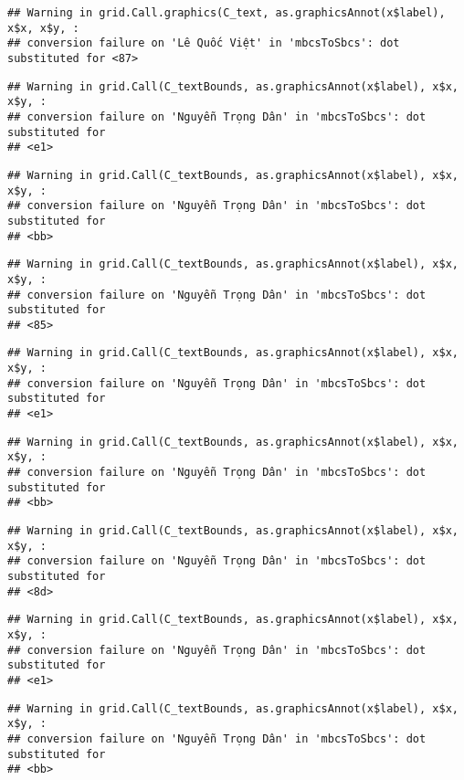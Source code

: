 \documentclass[
]{article}
\begin{document}
\begin{verbatim}
## Warning in grid.Call.graphics(C_text, as.graphicsAnnot(x$label), x$x, x$y, :
## conversion failure on 'Lê Quốc Việt' in 'mbcsToSbcs': dot substituted for <87>
\end{verbatim}

\begin{verbatim}
## Warning in grid.Call(C_textBounds, as.graphicsAnnot(x$label), x$x, x$y, :
## conversion failure on 'Nguyễn Trọng Dân' in 'mbcsToSbcs': dot substituted for
## <e1>
\end{verbatim}

\begin{verbatim}
## Warning in grid.Call(C_textBounds, as.graphicsAnnot(x$label), x$x, x$y, :
## conversion failure on 'Nguyễn Trọng Dân' in 'mbcsToSbcs': dot substituted for
## <bb>
\end{verbatim}

\begin{verbatim}
## Warning in grid.Call(C_textBounds, as.graphicsAnnot(x$label), x$x, x$y, :
## conversion failure on 'Nguyễn Trọng Dân' in 'mbcsToSbcs': dot substituted for
## <85>
\end{verbatim}

\begin{verbatim}
## Warning in grid.Call(C_textBounds, as.graphicsAnnot(x$label), x$x, x$y, :
## conversion failure on 'Nguyễn Trọng Dân' in 'mbcsToSbcs': dot substituted for
## <e1>
\end{verbatim}

\begin{verbatim}
## Warning in grid.Call(C_textBounds, as.graphicsAnnot(x$label), x$x, x$y, :
## conversion failure on 'Nguyễn Trọng Dân' in 'mbcsToSbcs': dot substituted for
## <bb>
\end{verbatim}

\begin{verbatim}
## Warning in grid.Call(C_textBounds, as.graphicsAnnot(x$label), x$x, x$y, :
## conversion failure on 'Nguyễn Trọng Dân' in 'mbcsToSbcs': dot substituted for
## <8d>
\end{verbatim}

\begin{verbatim}
## Warning in grid.Call(C_textBounds, as.graphicsAnnot(x$label), x$x, x$y, :
## conversion failure on 'Nguyễn Trọng Dân' in 'mbcsToSbcs': dot substituted for
## <e1>
\end{verbatim}

\begin{verbatim}
## Warning in grid.Call(C_textBounds, as.graphicsAnnot(x$label), x$x, x$y, :
## conversion failure on 'Nguyễn Trọng Dân' in 'mbcsToSbcs': dot substituted for
## <bb>
\end{verbatim}
\end{document}
